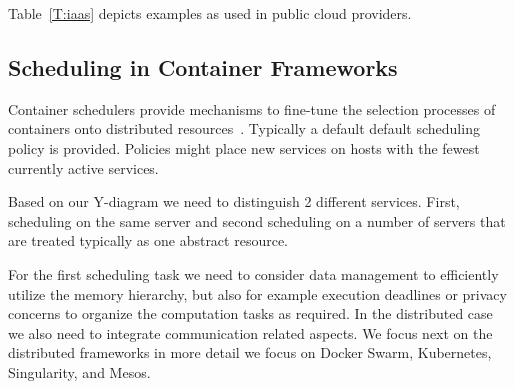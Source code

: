 \documentclass[final,5p,times,twocolumn]{elsarticle}
\begin{document}
Table~\ref{T:iaas} depicts examples as used in public cloud providers.






\subsection{Scheduling in Container Frameworks}
\label{sec:container}


Container schedulers provide mechanisms to fine-tune the selection
processes of containers onto distributed
resources~\cite{Containers2018,de2018distributed}. Typically a default
default scheduling policy is provided. Policies might place new
services on hosts with the fewest currently active services.

Based on our Y-diagram we need to distinguish 2 different
services. First, scheduling on the same server and second scheduling
on a number of servers that are treated typically as one abstract
resource.

For the first scheduling task we need to consider data management to
efficiently utilize the memory hierarchy, but also for example
execution deadlines or privacy concerns to organize the computation
tasks as required. In the distributed case we also need to integrate
communication related aspects. We focus next on the distributed
frameworks in more detail we focus on Docker Swarm, Kubernetes,
Singularity, and Mesos.
\end{document}
